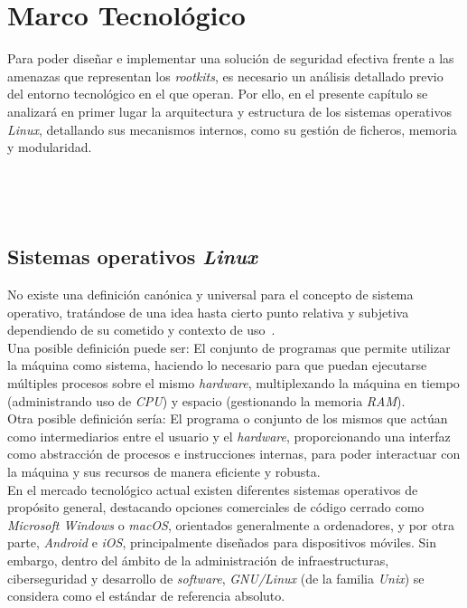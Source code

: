 \chapter{Marco Tecnológico}
\label{cap:capitulo2}

Para poder diseñar e implementar una solución de seguridad efectiva frente a las amenazas que representan los \textit{rootkits}, es necesario un análisis detallado previo del entorno tecnológico en el que operan.
Por ello, en el presente capítulo se analizará en primer lugar la arquitectura y estructura de los sistemas operativos \textit{Linux}, detallando sus mecanismos internos, como su gestión de ficheros, memoria y modularidad.

\

\

\section{Sistemas operativos \textit{Linux}}
\label{sec:linux}

No existe una definición canónica y universal para el concepto de sistema operativo, tratándose de una idea hasta cierto punto relativa y subjetiva dependiendo de su cometido y contexto de uso~\cite{librossoo}.\\

Una posible definición puede ser: El conjunto de programas que permite utilizar la máquina como sistema, haciendo lo necesario para que puedan ejecutarse múltiples procesos sobre el mismo \textit{hardware}, multiplexando la máquina en tiempo (administrando uso de \textit{CPU}) y espacio (gestionando la memoria \textit{RAM}).\\

Otra posible definición sería: El programa o conjunto de los mismos que actúan como intermediarios entre el usuario y el \textit{hardware}, proporcionando una interfaz como abstracción de procesos e instrucciones internas, para poder interactuar con la máquina y sus recursos de manera eficiente y robusta.\\

En el mercado tecnológico actual existen diferentes sistemas operativos de propósito general, destacando opciones comerciales de código cerrado como \textit{Microsoft Windows} o \textit{macOS}, orientados generalmente a ordenadores, y por otra parte, \textit{Android} e \textit{iOS}, principalmente diseñados para dispositivos móviles. Sin embargo, dentro del ámbito de la administración de infraestructuras, ciberseguridad y desarrollo de \textit{software}, \textit{GNU/Linux} (de la familia \textit{Unix}) se considera como el estándar de referencia absoluto.\\

